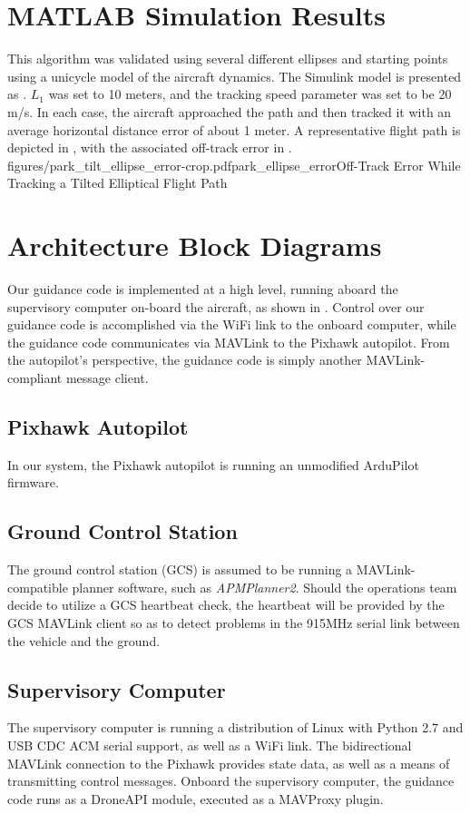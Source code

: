 \documentclass{aiaa}
\begin{document}
\section{MATLAB Simulation Results}
This algorithm was validated using several different ellipses and starting points using a unicycle model of the aircraft dynamics. The Simulink model is presented as . $L_1$ was set to 10 meters, and the tracking speed parameter was set to be 20 m/s.  In each case, the aircraft approached the path and then tracked it with an average horizontal distance error of about 1 meter. A representative flight path is depicted in , with the associated off-track error in .
{figures/park_tilt_ellipse_error-crop.pdf}{park_ellipse_error}{Off-Track Error While Tracking a Tilted Elliptical Flight Path}
\section{Architecture Block Diagrams}
Our guidance code is implemented at a high level, running aboard the supervisory computer on-board the aircraft, as shown in . Control over our guidance code is accomplished via the WiFi link to the onboard computer, while the guidance code communicates via MAVLink to the Pixhawk autopilot. From the autopilot's perspective, the guidance code is simply another MAVLink-compliant message client. 
\subsection{Pixhawk Autopilot}
In our system, the Pixhawk autopilot is running an unmodified ArduPilot firmware.
\subsection{Ground Control Station}
The ground control station (GCS) is assumed to be running a MAVLink-compatible planner software, such as \textit{APMPlanner2}. Should the operations team decide to utilize a GCS heartbeat check, the heartbeat will be provided by the GCS MAVLink client so as to detect problems in the 915MHz serial link between the vehicle and the ground. 
\subsection{Supervisory Computer}
The supervisory computer is running a distribution of Linux with Python 2.7 and USB CDC ACM serial support, as well as a WiFi link. The bidirectional MAVLink connection to the Pixhawk provides state data, as well as a means of transmitting control messages. Onboard the supervisory computer, the guidance code runs as a DroneAPI module, executed as a MAVProxy plugin.
\end{document}
